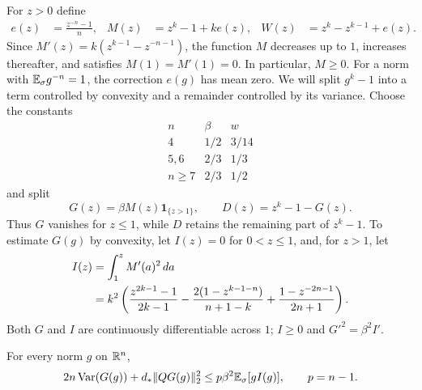 For $z>0$ define
\begin{align}
 e(z)&=\frac{z^{-n}-1}{n},&
 M(z)&=z^k-1+k e(z),&
 W(z)&=z^k-z^{k-1}+e(z).\label{eq:scalar-basic}
\end{align}
Since $M'(z)=k(z^{k-1}-z^{-n-1})$, the function $M$ decreases up to
$1$, increases thereafter, and satisfies $M(1)=M'(1)=0$.  In particular,
$M\ge0$.  For a norm with $\mathbb E_{\sigma} g^{-n}=1$, the correction $e(g)$
has mean zero. We will split $g^k-1$ into a term controlled by
convexity and a remainder controlled by its variance. Choose the constants
\begin{equation}\label{eq:scalar-constants}
\begin{array}{c|cc}
 n&\beta&w\\ \hline
 4&1/2&3/14\\
 5,6&2/3&1/3\\
 n\ge7&2/3&1/2
\end{array}
\end{equation}
and split
\begin{equation}\label{eq:scalar-split}
 G(z)=\beta M(z)\mathbf 1_{\{z>1\}},\qquad
 D(z)=z^k-1-G(z).
\end{equation}
Thus $G$ vanishes for $z\le1$, while $D$ retains the remaining part
of $z^k-1$. To estimate $G(g)$ by convexity,
let $I(z)=0$ for $0<z\le1$, and, for $z>1$, let
\begin{align}
 I(z)&=\int_1^z M'(a)^2\,da\notag\\
 &=k^2\left(\frac{z^{2k-1}-1}{2k-1}
 -\frac{2(1-z^{k-1-n})}{n+1-k}
 +\frac{1-z^{-2n-1}}{2n+1}\right).
 \label{eq:scalar-I}
\end{align}
Both $G$ and $I$ are continuously differentiable across $1$;
$I\ge0$ and $G'^2=\beta^2 I'$.

\begin{lemma}\label{lem:curvature}
For every norm $g$ on $\mathbb R^n$,
\begin{equation}\label{eq:norm-curvature}
 2n\operatorname{Var}(G(g))+d_*\|QG(g)\|_2^2
 \le p\beta^2\mathbb E_{\sigma}[gI(g)],\qquad p=n-1.
\end{equation}
\end{lemma}

